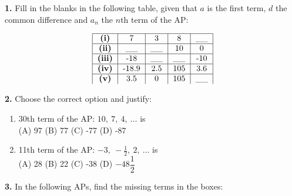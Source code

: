 \documentclass[12pt]{article}
\begin{document}
\textbf{1.} Fill in the blanks in the following table, given that \( a \) is the first term, \( d \) the common difference and \( a_n \) the \( n \)th term of the AP:

\[
\begin{tabular}{|c|c|c|c|c|}
\hline
\textbf{(i)} & 7 & 3 & 8 & \_\_ \\
\hline
\textbf{(ii)} & \_\_ & \_\_ & 10 & 0 \\
\hline
\textbf{(iii)} & -18 & \_\_ & \_\_ & -10 \\
\hline
\textbf{(iv)} & -18.9 & 2.5 & 105 & 3.6 \\
\hline
\textbf{(v)} & 3.5 & 0 & 105 & \_\_ \\

\end{tabular}
\]

\textbf{2.} Choose the correct option and justify:

\begin{enumerate}[label=(\alph*)]
    \item 30th term of the AP: \( 10,\ 7,\ 4,\ \ldots \) is\\
    (A) 97 \quad (B) 77 \quad (C) -77 \quad (D) -87

    \item 11th term of the AP: \( -3,\ -\frac{1}{2},\ 2,\ \ldots \) is\\
    (A) 28 \quad (B) 22 \quad (C) -38 \quad (D) $-48\dfrac{1}{2}$
\end{enumerate}



\textbf{3.} In the following APs, find the missing terms in the boxes:
\end{document}

